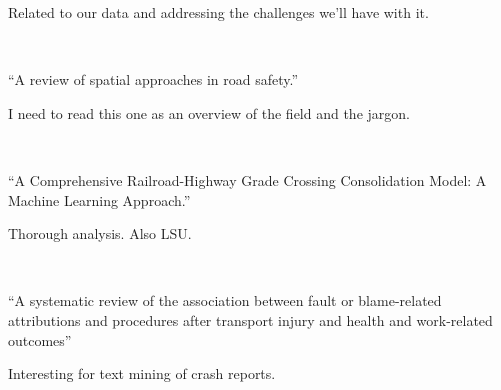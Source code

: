 \documentclass[11pt]{article}
\begin{document}
\begin{spacing}{1.2}
Related to our data and addressing the challenges we'll have with it.  

\

``A review of spatial approaches in road safety.''

I need to read this one as an overview of the field and the jargon.  

\

``A Comprehensive Railroad-Highway Grade Crossing Consolidation Model: A Machine Learning Approach.''

Thorough analysis.  Also LSU.

\

``A systematic review of the association between fault or blame-related attributions and procedures after transport injury and health and work-related outcomes''

Interesting for text mining of crash reports.  

\



\clearpage
{}
\printindex

\end{spacing}
\end{document}
